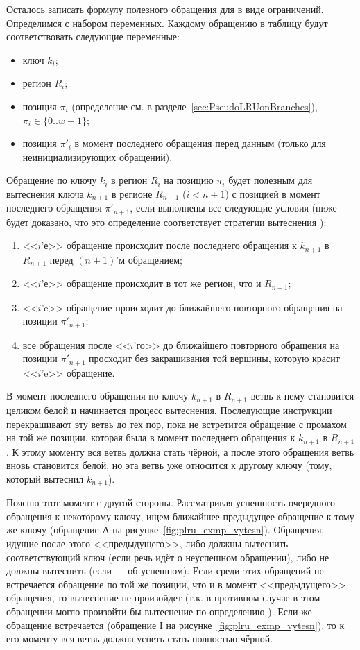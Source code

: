 \begin{enumerate}
Осталось записать формулу полезного обращения для \PseudoLRU в виде ограничений. Определимся с набором переменных. Каждому обращению в таблицу будут соответствовать следующие переменные:
\begin{itemize}
  \item ключ $k_i$;
  \item регион $R_i$;
  \item позиция $\pi_i$ (определение см. в разделе~\ref{sec:PseudoLRUonBranches}), $\pi_i \in \{0..w{-}1\}$;
  \item позиция $\pi'_i$ в момент последнего обращения перед данным (только для неинициализирующих обращений).
\end{itemize}

Обращение по ключу $k_i$ в регион $R_i$ на позицию $\pi_i$ будет полезным для вытеснения ключа $k_{n+1}$ в регионе $R_{n+1}$ ($i < n+1$) с позицией в момент последнего обращения $\pi'_{n+1}$, если выполнены все следующие условия (ниже будет доказано, что это определение соответствует стратегии вытеснения \PseudoLRU):
\begin{enumerate}
  \item <<$i$'е>> обращение происходит после последнего обращения к $k_{n+1}$ в $R_{n+1}$ перед $(n+1)$'м обращением;
  \item <<$i$'е>> обращение происходит в тот же регион, что и $R_{n+1}$;
  \item <<$i$'e>> обращение происходит до ближайшего повторного обращения на позиции $\pi'_{n+1}$;
  \item все обращения после <<$i$'го>> до ближайшего повторного обращения на позиции $\pi'_{n+1}$ просходит без закрашивания той вершины, которую красит <<$i$'e>> обращение.
\end{enumerate}

В момент последнего обращения по ключу $k_{n+1}$ в $R_{n+1}$ ветвь к нему становится целиком белой и начинается процесс вытеснения. Последующие инструкции перекрашивают эту ветвь до тех пор, пока не встретится обращение с промахом на той же позиции, которая была в момент последнего обращения к $k_{n+1}$ в $R_{n+1}$. К этому моменту вся ветвь должна стать чёрной, а после этого обращения ветвь вновь становится белой, но эта ветвь уже относится к другому ключу (тому, который вытеснил $k_{n+1}$).

Поясню этот момент с другой стороны. Рассматривая успешность очередного обращения к некоторому ключу, ищем ближайшее предыдущее обращение к тому же ключу (обращение А на рисунке~\ref{fig:plru_exmp_vytesn}). Обращения, идущие после этого <<предыдущего>>, либо должны вытеснить соответствующий ключ (если речь идёт о неуспешном обращении), либо не должны вытеснить (если --- об успешном). Если среди этих обращений не встречается обращение по той же позиции, что и в момент <<предыдущего>> обращения, то вытеснение не произойдет (т.к. в противном случае в этом обращении могло произойти бы вытеснение по определению \PseudoLRU). Если же обращение встречается (обращение I на рисунке~\ref{fig:plru_exmp_vytesn}), то к его моменту вся ветвь должна успеть стать полностью чёрной.


\end{enumerate}
